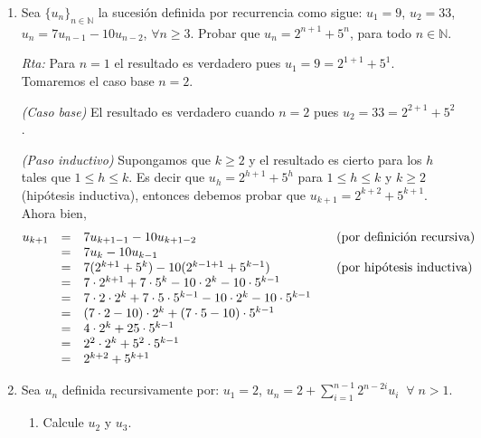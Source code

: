 \documentclass[12pt,spanish,makeidx]{amsbook}
\newcommand{\rta}{\noindent\textit{Rta: }}
\begin{document}
\begin{enumerate}
		\smallskip
		
		\item Sea $\{ u_n \}_{n \in \mathbb N}$ la sucesión definida por recurrencia como sigue: $u_1 = 9$, $u_2 = 33$, $u_n = 7u_{n-1} - 10u_{n-2}$, $\forall n \geq 3$. Probar que $u_n = 2^{n+1} + 5^n$, para todo $n \in \mathbb N$.
		
		
		\rta Para $n=1$ el resultado es verdadero pues $u_1 = 9 = 2^{1+1} + 5^1$. Tomaremos el caso  base $n=2$.
		
		\textit{(Caso  base) }El resultado es verdadero cuando  $n=2$ pues $u_2 = 33 = 2^{2+1} + 5^2$.
		
		{\it (Paso  inductivo) } Supongamos que $k \ge 2$ y el resultado  es cierto para los $h$ tales que  $1 \le h \le k$. Es decir que $u_h = 2^{h+1} + 5^h$ para $1 \le h \le k$ y $k \ge 2$ (hipótesis inductiva), entonces debemos probar que $u_{k+1} = 2^{k+2}+5^{k+1}$. Ahora bien, 
		\begin{equation*}
		\begin{matrix}
		u_{k+1} &=& 7u_{k+1-1} - 10u_{k+1-2}  \hfill &\quad \text{(por definición recursiva)} \hfill \\
		&=& 7u_{k} - 10u_{k-1}  \hfill &\hfill\\
		&=& 7( 2^{k+1} + 5^k) -10 ( 2^{k-1+1} + 5^{k-1})  \hfill &\quad \text{(por hipótesis inductiva})\hfill \\
		&=& 7 \cdot  2^{k+1} + 7 \cdot 5^k -10 \cdot  2^{k} -10 \cdot  5^{k-1} \hfill  & \hfill\\
		&=& 7 \cdot 2 \cdot  2^{k} + 7 \cdot 5 \cdot 5^{k-1} -10 \cdot  2^{k} -10 \cdot  5^{k-1}  \hfill  & \hfill\\
		&=& (7 \cdot 2 -10 ) \cdot  2^{k} + (7 \cdot 5 -10) \cdot 5^{k-1}  \hfill  & \hfill\\
		&=& 4 \cdot  2^{k} + 25 \cdot 5^{k-1}  \hfill  & \hfill\\
		&=& 2^2 \cdot  2^{k} + 5^2 \cdot 5^{k-1}  \hfill  & \hfill\\
		&=& 2^{k+2} + 5^{k+1}  \hfill  & \hfill
		\end{matrix}
		\end{equation*}
		
		
				
		\smallskip
		
		\item Sea $u_n$ definida recursivamente por: $u_1=2$, $u_n=2+\sum_{i=1}^{n-1}2^{n-2i}u_i \;\;\forall\; n >1$.
		\begin{enumerate}
			\item Calcule $u_2$ y $u_3$.
			

\end{enumerate}
\end{enumerate}
\end{document}
